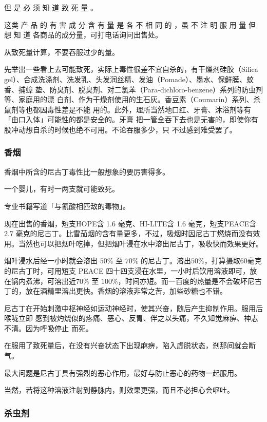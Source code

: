 \documentclass[UTF8]{ctexart}
\begin{document}
但 是 必 须 知 道 致 死 量 。

这类 产 品 的 有 害 成 分 含 有 量 是 各 不 相 同 的 ，虽 不 注 明 服 用 量 但 想 知 道 各商品的成分量，可打电话询问出售处。

从致死量计算，不要吞服过少的量。

先举出一些看上去可能致死，实际上毒性很差不宜自杀的，有干燥剂硅胶（Silica
gel）、合成洗涤剂、洗发乳、头发润丝精、发油（Pomade）、墨水、保鲜膜、蚊香、捕蟑
垫、防臭剂、脱臭剂、对二氯苯（Para-dichloro-benzene）系列的防虫剂等、家庭用的漂
白剂、作为干燥剂使用的生石灰。香豆素（Coumarin）系列、杀鼠剂等也都因毒性差是不能
用的。此外，理所当然地口红、牙膏、沐浴剂等有「由口入体」可能性的都是安全的。牙膏
把一管全吞下去也是无害的，即使你有股冲动想自杀的时候也绝不可用。不论吞服多少，只
不过感到难受罢了。

\subsubsection{香烟}

香烟中所含的尼古丁毒性比一般想象的要厉害得多。

一个婴儿，有时一两支就可能致死。

专业书籍写道「与氰酸相匹敌的毒物」。

现在出售的香烟，短支HOPE含 1.6 毫克、HI-LITE含 1.6 毫克，短支PEACE含 2.7
毫克的尼古丁。比雪茄烟的含有量更多，不过，吸烟时因尼古丁燃烧而没有效用。当然也可以把烟叶吃掉，但把烟叶浸在水中溶出尼古丁，吸收快而效果更好。

烟叶浸水后经一小时就会溶出 $50\%$ 至 $70\%$ 的尼古丁。溶出$50\%$，打算摄取$60$毫克的尼古丁时，可用短支 PEACE 四十四支浸在水里，一小时后饮用溶液即可，放在锅内煮沸，可溶出近$70\%$ 至 $100\%$，时间亦短。而一百度的热量是不会破坏尼古丁的，放在酒精里溶出更快。香烟的溶液非常之苦，加些砂糖也不错。

尼古丁在开始刺激中枢神经如运动神经时，使其兴奋，随后产生抑制作用。服用后喉咙立即 感到被灼烧似的疼痛、恶心、反胃、伴之以头痛，不久知觉麻痹、神志不清。因为呼吸停止 而死。

在服用了致死量后，在没有兴奋状态下出现麻痹，陷入虚脱状态，剎那间就会断气。

最大问题是尼古丁具有强烈的恶心作用，最好与防止恶心的药物一起服用。

当然，若将这种溶液注射到静脉内，则效果更强，而且不必担心会呕吐。

\subsubsection{杀虫剂}
\end{document}
